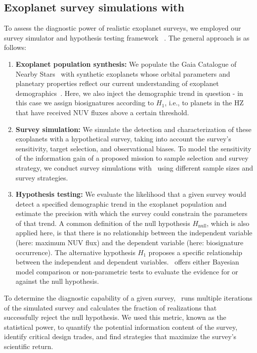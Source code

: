\documentclass[twocolumn,twocolappendix,linenumbers]{aastex631}
\begin{document}
\subsection{Exoplanet survey simulations with \bioverse}
To assess the diagnostic power of realistic exoplanet surveys, we employed our survey simulator and hypothesis testing framework \bioverse~\citep{Bixel2021}.
The general approach is as follows:
\begin{enumerate}
\item \textbf{Exoplanet population synthesis:} We populate the Gaia Catalogue of Nearby Stars~\citep{Smart2021} with synthetic exoplanets whose orbital parameters and planetary properties reflect our current understanding of exoplanet demographics~\citep{Bergsten2022,Hardegree-Ullman2023}.
Here, we also inject the demographic trend in question - in this case we assign biosignatures according to $H_1$, i.e., to planets in the \gls{HZ} that have received \gls{NUV} fluxes above a certain threshold.
    \item \textbf{Survey simulation:} We simulate the detection and characterization of these exoplanets with a hypothetical survey, taking into account the survey's sensitivity, target selection, and observational biases.
To model the sensitivity of the information gain of a proposed mission to sample selection and survey strategy, we conduct survey simulations with \bioverse\ using different sample sizes and survey strategies.
    \item \textbf{Hypothesis testing:} We evaluate the likelihood that a given survey would detect a specified demographic trend in the exoplanet population and estimate the precision with which the survey could constrain the parameters of that trend.
    A common definition of the null hypothesis $H_\mathrm{null}$, which is also applied here, is that there is no relationship between the independent variable (here: maximum \gls{NUV} flux) and the dependent variable (here: biosignature occurrence).
    The alternative hypothesis $H_1$ proposes a specific relationship between the independent and dependent variables.
    \bioverse\ offers either Bayesian model comparison or non-parametric tests to evaluate the evidence for or against the null hypothesis.
\end{enumerate}

To determine the diagnostic capability of a given survey, \bioverse\ runs multiple iterations of the simulated survey and calculates the fraction of realizations that successfully reject the null hypothesis.
We used this metric, known as the statistical power, to quantify the potential information content of the survey, identify critical design trades, and find strategies that maximize the survey's scientific return.
\end{document}
